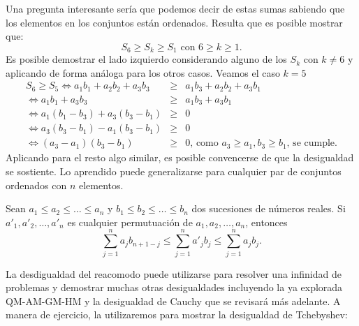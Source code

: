 \documentclass[11pt]{scrartcl}
\begin{document}
Una pregunta interesante ser\'ia que podemos decir de estas sumas sabiendo que los elementos en los conjuntos est\'an ordenados. Resulta que es posible mostrar que:
\begin{equation*}
    S_6 \geq S_k \geq S_1 \text{ con } 6 \geq k \geq 1.
\end{equation*}
Es posible demostrar el lado izquierdo considerando alguno de los $S_k$ con $k \neq 6$ y aplicando de forma an\'aloga para los otros casos. Veamos el caso $k = 5$
\begin{eqnarray*}
    S_6 \geq S_5 \iff a_1b_1 + a_2b_2 + a_3b_3 &\geq& a_1b_3 + a_2b_2 + a_3b_1\\
    \iff a_1b_1 + a_3b_3 &\geq& a_1b_3 + a_3b_1\\
    \iff a_1\left(b_1 - b_3\right) + a_3\left(b_3 - b_1\right) &\geq& 0\\
    \iff a_3\left(b_3 - b_1\right) - a_1\left(b_3 - b_1\right) &\geq& 0\\
    \iff \left(a_3 - a_1\right)\left(b_3 - b_1\right) &\geq& 0 \text{, como } a_3 \geq a_1, b_3 \geq b_1 \text{, se cumple.}
\end{eqnarray*}
Aplicando para el resto algo similar, es posible convencerse de que la desigualdad se sostiente. Lo aprendido puede generalizarse para cualquier par de conjuntos ordenados con $n$ elementos.

\begin{theorem} [Reacomodo]
Sean $a_1 \leq a_2 \leq \dots \leq a_n$ y $b_1 \leq b_2 \leq \dots \leq b_n$ dos sucesiones de n\'umeros reales. Si $a'_1, a'_2, \dots, a'_n$ es cualquier permutuaci\'on de $a_1, a_2, \dots, a_n$, entonces
$$\sum_{j=1}^{n} a_jb_{n+1-j} \leq \sum_{j=1}^{n} a'_jb_{j} \leq \sum_{j=1}^{n} a_jb_{j}.$$
\end{theorem}

\noindent
La desdigualdad del reacomodo puede utilizarse para resolver una infinidad de problemas y demostrar muchas otras desigualdades incluyendo la ya explorada QM-AM-GM-HM y la desigualdad de Cauchy que se revisar\'a m\'as adelante. A manera de ejercicio, la utilizaremos para mostrar la desigualdad de Tchebyshev:
\end{document}
